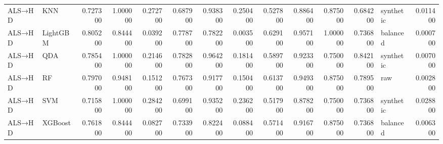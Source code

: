 \begin{longtable}{llrrrrrrrrrrlr}
ALS→HD & KNN & 0.727300 & 1.000000 & 0.272700 & 0.687900 & 0.938300 & 0.250400 & 0.527800 & 0.886400 & 0.875000 & 0.684200 & synthetic & 0.011400 \\
ALS→HD & LightGBM & 0.805200 & 0.844400 & 0.039200 & 0.778700 & 0.782200 & 0.003500 & 0.629100 & 0.957100 & 1.000000 & 0.736800 & balanced & 0.000700 \\
ALS→HD & QDA & 0.785400 & 1.000000 & 0.214600 & 0.782800 & 0.964200 & 0.181400 & 0.589700 & 0.923300 & 0.750000 & 0.842100 & synthetic & 0.007000 \\
ALS→HD & RF & 0.797000 & 0.948100 & 0.151200 & 0.767300 & 0.917700 & 0.150400 & 0.613700 & 0.949300 & 0.875000 & 0.789500 & raw & 0.002800 \\
ALS→HD & SVM & 0.715800 & 1.000000 & 0.284200 & 0.699100 & 0.935200 & 0.236200 & 0.517900 & 0.878200 & 0.750000 & 0.736800 & synthetic & 0.028800 \\
ALS→HD & XGBoost & 0.761800 & 0.844400 & 0.082700 & 0.733900 & 0.822400 & 0.088400 & 0.571400 & 0.916700 & 0.875000 & 0.736800 & balanced & 0.006300 \\
\end{longtable}
